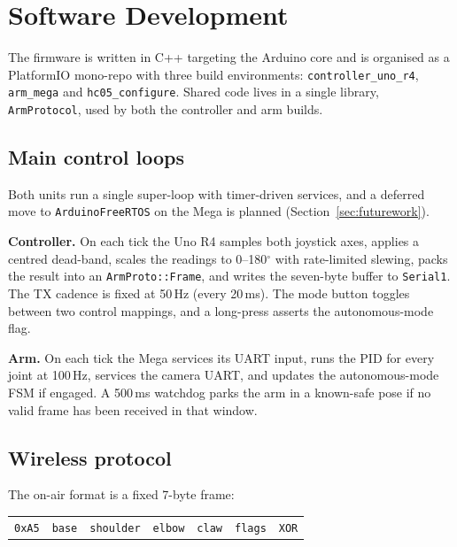 \section{Software Development}
\label{sec:software}

The firmware is written in C++ targeting the Arduino core and is
organised as a PlatformIO mono-repo with three build environments:
\texttt{controller\_uno\_r4}, \texttt{arm\_mega} and
\texttt{hc05\_configure}. Shared code lives in a single library,
\texttt{ArmProtocol}, used by both the controller and arm builds.

\subsection{Main control loops}
\label{sec:loops}
Both units run a single super-loop with timer-driven services, and a
deferred move to \texttt{ArduinoFreeRTOS} on the Mega is planned
(Section~\ref{sec:futurework}).

\textbf{Controller.} On each tick the Uno R4 samples both joystick
axes, applies a centred dead-band, scales the readings to 0--180$^\circ$
with rate-limited slewing, packs the result into an
\texttt{ArmProto::Frame}, and writes the seven-byte buffer to
\texttt{Serial1}. The TX cadence is fixed at 50\,Hz (every 20\,ms).
The mode button toggles between two control mappings, and a long-press
asserts the autonomous-mode flag.

\textbf{Arm.} On each tick the Mega services its UART input, runs the
PID for every joint at 100\,Hz, services the camera UART, and updates
the autonomous-mode FSM if engaged. A 500\,ms watchdog parks the arm
in a known-safe pose if no valid frame has been received in that
window.

\subsection{Wireless protocol}
\label{sec:protocol}
The on-air format is a fixed 7-byte frame:

\begin{center}\footnotesize
\begin{tabular}{c|c|c|c|c|c|c}
\texttt{0xA5} & \texttt{base} & \texttt{shoulder} & \texttt{elbow} &
\texttt{claw} & \texttt{flags} & \texttt{XOR} \\
\end{tabular}
\end{center}

